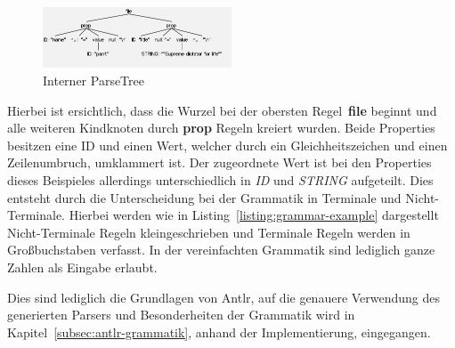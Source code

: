 \begin{figure}[h]
    \centering
    \includegraphics[width=0.5\textwidth]{images/2.2/parseTreeExample}
    \caption{Interner ParseTree}
    \label{fig:parse-example}
\end{figure}

Hierbei ist ersichtlich, dass die Wurzel bei der obersten Regel~\textbf{file} beginnt und alle weiteren Kindknoten durch \textbf{prop} Regeln kreiert wurden.
Beide Properties besitzen eine ID und einen Wert, welcher durch ein Gleichheitszeichen und einen Zeilenumbruch, umklammert ist.
Der zugeordnete Wert ist bei den Properties dieses Beispieles allerdings unterschiedlich in \textit{ID} und \textit{STRING} aufgeteilt.
Dies entsteht durch die Unterscheidung bei der Grammatik in Terminale und Nicht-Terminale.
Hierbei werden wie in Listing~\ref{listing:grammar-example} dargestellt Nicht-Terminale Regeln kleingeschrieben und Terminale Regeln werden in Großbuchstaben verfasst.
In der vereinfachten Grammatik sind lediglich ganze Zahlen als Eingabe erlaubt.

Dies sind lediglich die Grundlagen von Antlr, auf die genauere Verwendung des generierten Parsers und Besonderheiten der Grammatik wird in Kapitel~\ref{subsec:antlr-grammatik},
anhand der Implementierung, eingegangen.